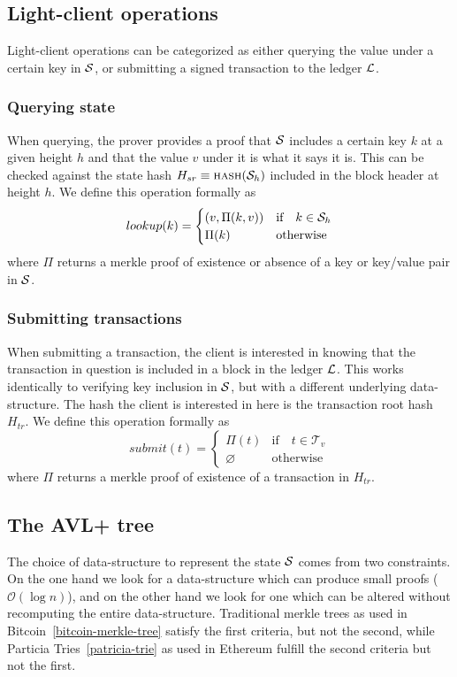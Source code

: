 \subsection{Light-client operations}

Light-client operations can be categorized as either querying the value under a
certain key in $\mathcal{S}$, or submitting a signed transaction to the ledger
$\mathcal{L}$.

\subsubsection{Querying state}

When querying, the prover provides a proof that $\mathcal{S}$ includes a certain key
$k$ at a given height $h$ and that the value $v$ under it is what it says it
is. This can be checked against the state hash $H_{sr} \equiv \text{\normalfont\scshape hash}(\mathcal{S}_h)$ included in the
block header at height $h$. We define this operation formally as
\[
    lookup(k) = \begin{cases}
        (v, \Pi(k, v))     & \text{if} \quad k \in \mathcal{S}_h \\
        \Pi(k)             & \text{otherwise}
    \end{cases}
\]
where $\Pi$ returns a merkle proof of existence or absence of a key or
key/value pair in $\mathcal{S}$.

\subsubsection{Submitting transactions}

When submitting a transaction, the client is interested in knowing that the
transaction in question is included in a block in the ledger $\mathcal{L}$. This
works identically to verifying key inclusion in $\mathcal{S}$, but with a different
underlying data-structure. The hash the client is interested in here is the
transaction root hash $H_{tr}$. We define this operation formally as
\[
    submit(t) = \begin{cases}
        \Pi(t)        & \text{if} \quad t \in \mathcal{T}_v \\
        \varnothing   & \text{otherwise}
    \end{cases}
\]
where $\Pi$ returns a merkle proof of existence of a transaction in $H_{tr}$.

\subsection{The AVL+ tree}

The choice of data-structure to represent the state $\mathcal{S}$ comes from two
constraints.  On the one hand we look for a data-structure which can produce
small proofs ($\mathcal{O}(\log n)$), and on the other hand we look for one
which can be altered without recomputing the entire data-structure. Traditional
merkle trees as used in Bitcoin~\ref{bitcoin-merkle-tree} satisfy the first
criteria, but not the second, while Particia Tries~\ref{patricia-trie} as used
in Ethereum fulfill the second criteria but not the first.
